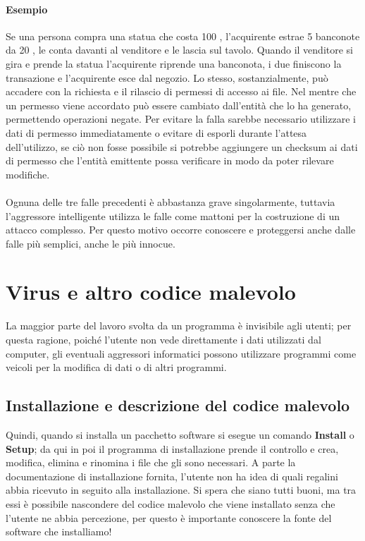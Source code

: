 \paragraph{Esempio} 
Se una persona compra una statua che costa 100 \officialeuro, l'acquirente estrae 5 banconote da 20 \officialeuro, le conta davanti al venditore e le lascia sul tavolo. Quando il venditore si gira e prende la statua l'acquirente riprende una banconota, i due finiscono la transazione e l'acquirente esce dal negozio.
Lo stesso, sostanzialmente, può accadere con la richiesta e il rilascio di permessi di accesso ai file. Nel mentre che un permesso viene accordato può essere cambiato dall'entità che lo ha generato, permettendo operazioni negate. Per evitare la falla sarebbe necessario utilizzare i dati di permesso immediatamente o evitare di esporli durante l'attesa dell'utilizzo, se ciò non fosse possibile si potrebbe aggiungere un checksum ai dati di permesso che l'entità emittente possa verificare in modo da poter rilevare modifiche. \\ \\
Ognuna delle tre falle precedenti è abbastanza grave singolarmente, tuttavia l'aggressore intelligente utilizza le falle come mattoni per la costruzione di un attacco complesso.
Per questo motivo occorre conoscere e proteggersi anche dalle falle più semplici, anche le più innocue.

\section{Virus e altro codice malevolo}
La maggior parte del lavoro svolta da un programma è invisibile agli utenti; per questa ragione, poiché l'utente non vede direttamente i dati utilizzati dal computer, gli eventuali aggressori informatici possono utilizzare programmi come veicoli per la modifica di dati o di altri programmi.
\subsection{Installazione e descrizione del codice malevolo}
Quindi, quando si installa un pacchetto software si esegue un comando \textbf{Install} o \textbf{Setup}; da qui in poi il programma di installazione prende il controllo e crea, modifica, elimina e rinomina i file che gli sono necessari.
\newline
A parte la documentazione di installazione fornita, l'utente non ha idea di quali regalini abbia ricevuto in seguito alla installazione. Si spera che siano tutti buoni, ma tra essi è possibile nascondere del codice malevolo che viene installato senza che l'utente ne abbia percezione, per questo è importante conoscere la fonte del software che installiamo!

